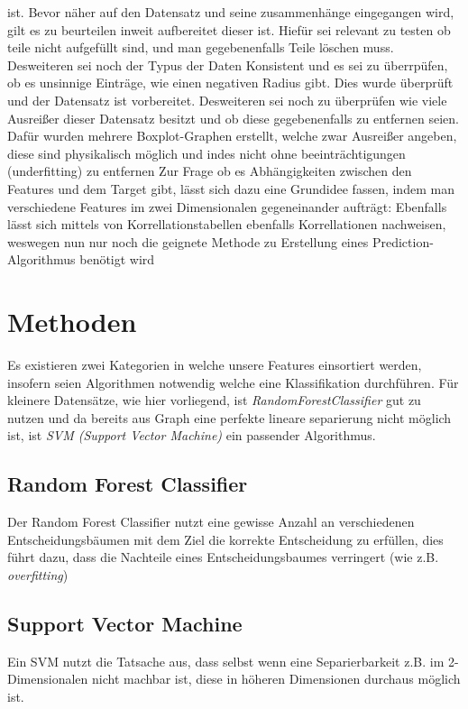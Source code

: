 \documentclass[a4paper,12pt]{article}
\begin{document}
ist.\newline
Bevor näher auf den Datensatz und seine zusammenhänge eingegangen wird, gilt es zu beurteilen inweit aufbereitet dieser ist.
Hiefür sei relevant zu testen ob teile nicht aufgefüllt sind, und man gegebenenfalls Teile löschen muss. Desweiteren sei noch der Typus
der Daten Konsistent und es sei zu überrpüfen, ob es unsinnige Einträge, wie einen negativen Radius gibt.
Dies wurde überprüft und der Datensatz ist vorbereitet.\newline
Desweiteren sei noch zu überprüfen wie viele Ausreißer dieser Datensatz besitzt und ob diese gegebenenfalls zu entfernen seien.
Dafür wurden mehrere Boxplot-Graphen erstellt, welche zwar Ausreißer angeben, diese sind physikalisch möglich und indes nicht ohne
beeinträchtigungen (underfitting) zu entfernen
\newline
Zur Frage ob es Abhängigkeiten zwischen den Features und dem Target gibt, lässt sich dazu eine Grundidee fassen, indem man verschiedene
Features im zwei Dimensionalen gegeneinander aufträgt:\newline
Ebenfalls lässt sich mittels von Korrellationstabellen ebenfalls Korrellationen nachweisen, weswegen nun nur noch die geignete Methode
zu Erstellung eines Prediction-Algorithmus benötigt wird
\newline

\section{Methoden}
Es existieren zwei Kategorien in welche unsere Features einsortiert werden, insofern seien Algorithmen notwendig welche eine Klassifikation durchführen.
Für kleinere Datensätze, wie hier vorliegend, ist \textit{ RandomForestClassifier} gut zu nutzen und da bereits aus Graph
eine perfekte lineare separierung nicht möglich ist, ist \textit{SVM (Support Vector Machine)} ein passender Algorithmus.
\subsection{Random Forest Classifier}
Der Random Forest Classifier nutzt eine gewisse Anzahl an verschiedenen Entscheidungsbäumen mit dem Ziel die korrekte Entscheidung zu erfüllen,
dies führt dazu, dass die Nachteile eines Entscheidungsbaumes verringert (wie z.B. \textit{overfitting})
\subsection{Support Vector Machine}
Ein SVM nutzt die Tatsache aus, dass selbst wenn eine Separierbarkeit z.B. im 2-Dimensionalen nicht machbar ist,
diese in höheren Dimensionen durchaus möglich ist.
\end{document}
